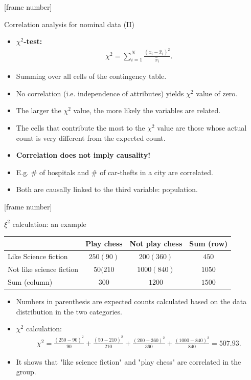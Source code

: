 \documentclass[aspectratio=169,t]{beamer}
\begin{document}
  {
    [frame number]
    \begin{frame}{Correlation analysis for nominal data (II)}
      \begin{itemize}
        \item \textbf{\color{airforceblue}$\chi^2$-test:}
        \begin{align}
          \chi^2 = \sum_{i=1}^{N} \frac{(x_i-\hat{x}_i)^2}{\hat{x}_i}.
        \end{align}
        \item Summing over all cells of the contingency table.
        \item No correlation (i.e. independence of attributes) yields $\chi^2$ value of zero.
        \item The larger the $\chi^2$ value, the more likely the variables are related.
        \item The cells that contribute the most to the $\chi^2$ value
are those whose actual count is very different from the expected count.
      \end{itemize}
      \begin{itemize}
        \item \textbf{Correlation does not imply causality!}
        \item E.g. $\#$ of hospitals and $\#$ of car-thefts in a city are correlated.
        \item Both are causally linked to the third variable: population.
      \end{itemize}
    \end{frame}
  }

  {
    [frame number]
    \begin{frame}{$\xi^2$ calculation: an example}
    \centering
    \begin{tabular}{l|c|c|c|}
    & Play chess & Not play chess & Sum (row)\\\hline
    Like Science fiction & $250 (90)$ & $200 (360)$ & $450$ \\\hline
    Not like science fiction & $50 (210$ & $1000 (840)$ & $1050$\\\hline
    Sum (column) & $300$ & $1200$ & $1500$\\\hline
    \end{tabular}
    \begin{itemize}
      \item Numbers in parenthesis are expected counts calculated based on the data distribution in the two categories.
      \item $\chi^2$ calculation:
      \begin{align}
      \chi^2 = \frac{(250-90)^2}{90} + \frac{(50-210)^2}{210} + \frac{(200-360)^2}{360} + \frac{(1000-840)^2}{840} = 507.93.
      \end{align}
      \item It shows that "like science fiction" and "play chess" are correlated in the group.
    \end{itemize}
    \end{frame}
  }
\end{document}
